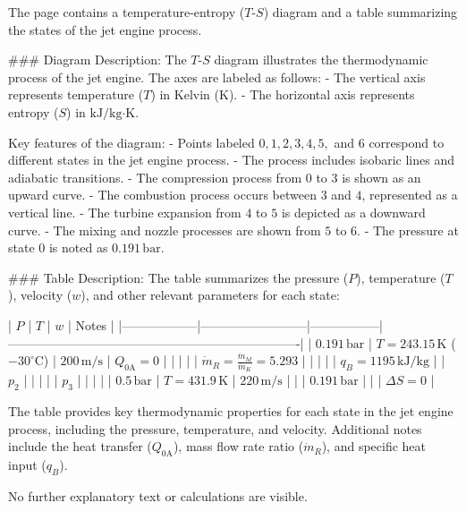 The page contains a temperature-entropy (\( T \)-\( S \)) diagram and a table summarizing the states of the jet engine process.  

### Diagram Description:  
The \( T \)-\( S \) diagram illustrates the thermodynamic process of the jet engine. The axes are labeled as follows:  
- The vertical axis represents temperature (\( T \)) in Kelvin (\( \text{K} \)).  
- The horizontal axis represents entropy (\( S \)) in \( \text{kJ/kg·K} \).  

Key features of the diagram:  
- Points labeled \( 0, 1, 2, 3, 4, 5, \) and \( 6 \) correspond to different states in the jet engine process.  
- The process includes isobaric lines and adiabatic transitions.  
- The compression process from \( 0 \) to \( 3 \) is shown as an upward curve.  
- The combustion process occurs between \( 3 \) and \( 4 \), represented as a vertical line.  
- The turbine expansion from \( 4 \) to \( 5 \) is depicted as a downward curve.  
- The mixing and nozzle processes are shown from \( 5 \) to \( 6 \).  
- The pressure at state \( 0 \) is noted as \( 0.191 \, \text{bar} \).  

### Table Description:  
The table summarizes the pressure (\( P \)), temperature (\( T \)), velocity (\( w \)), and other relevant parameters for each state:  

| \( P \)         | \( T \)                  | \( w \)         | Notes                                                                 |
|------------------|--------------------------|-----------------|----------------------------------------------------------------------|
| \( 0.191 \, \text{bar} \) | \( T = 243.15 \, \text{K} \) (\( -30^\circ\text{C} \)) | \( 200 \, \text{m/s} \) | \( Q_{\text{0A}} = 0 \)                                               |
|                  |                          |                 | \( \dot{m}_R = \frac{\dot{m}_M}{\dot{m}_K} = 5.293 \)                 |
|                  |                          |                 | \( q_B = 1195 \, \text{kJ/kg} \)                                      |
| \( p_2 \)       |                          |                 |                                                                      |
| \( p_3 \)       |                          |                 |                                                                      |
| \( 0.5 \, \text{bar} \) | \( T = 431.9 \, \text{K} \)          | \( 220 \, \text{m/s} \) |                                                                      |
| \( 0.191 \, \text{bar} \) |                          |                 | \( \Delta S = 0 \)                                                   |  

The table provides key thermodynamic properties for each state in the jet engine process, including the pressure, temperature, and velocity. Additional notes include the heat transfer (\( Q_{\text{0A}} \)), mass flow rate ratio (\( \dot{m}_R \)), and specific heat input (\( q_B \)).  

No further explanatory text or calculations are visible.
